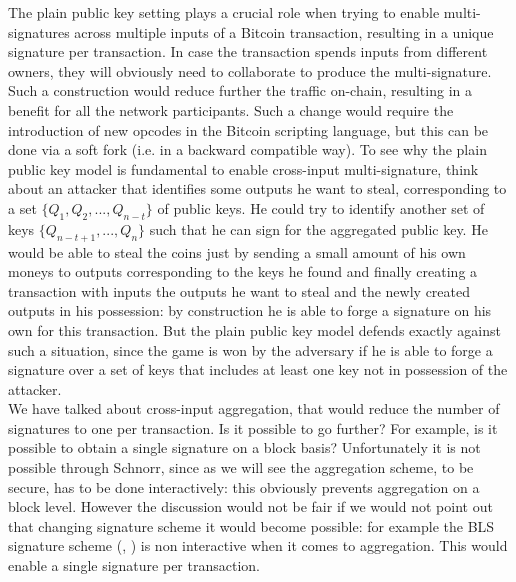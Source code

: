 \bigskip
\noindent
The plain public key setting plays a crucial role when trying to enable multi-signatures across multiple inputs of a Bitcoin transaction, resulting in a unique signature per transaction.  In case the transaction spends inputs from different owners, they will obviously need to collaborate to produce the multi-signature. Such a construction would reduce further the traffic on-chain, resulting in a benefit for all the network participants. Such a change would require the introduction of new opcodes in the Bitcoin scripting language, but this can be done via a soft fork (i.e. in a backward compatible way). To see why the plain public key model is fundamental to enable cross-input multi-signature, think about an attacker that identifies some outputs he want to steal, corresponding to a set $\{Q_1, Q_2, ..., Q_{n - t}\}$ of public keys. He could try to identify another set of keys $\{Q_{n - t + 1}, ..., Q_n\}$ such that he can sign for the aggregated public key. He would be able to steal the coins just by sending a small amount of his own moneys to outputs corresponding to the keys he found and finally creating a transaction with inputs the outputs he want to steal and the newly created outputs in his possession: by construction he is able to forge a signature on his own for this transaction. But the plain public key model defends exactly against such a situation, since the game is won by the adversary if he is able to forge a signature over a set of keys that includes at least one key not in possession of the attacker. 
\\
We have talked about cross-input aggregation, that would reduce the number of signatures to one per transaction. Is it possible to go further? For example, is it possible to obtain a single signature on a block basis? Unfortunately it is not possible through Schnorr, since as we will see the aggregation scheme, to be secure, has to be done interactively: this obviously prevents aggregation on a block level. However the discussion would not be fair if we would not point out that changing signature scheme it would become possible: for example the BLS signature scheme (\cite{RefWork:15}, \cite{RefWork:16}) is non interactive when it comes to aggregation. This would enable a single signature per transaction. 

